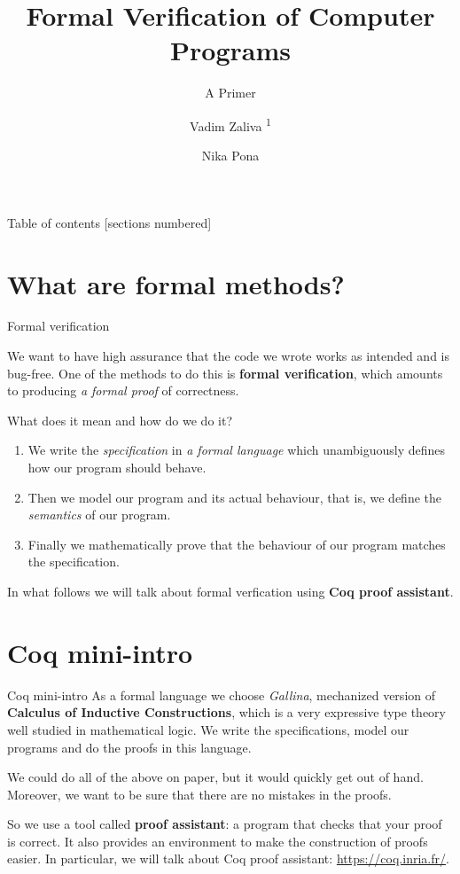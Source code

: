 \documentclass[10pt]{beamer}
\title{Formal Verification of Computer Programs}
\subtitle{A Primer}
\date{\date{}}
\author[shortname]{Vadim Zaliva \textsuperscript{1} \and Nika Pona \inst{2}}
\institute[shortinst]{\textsuperscript{1}Carnegie Mellon  University \and \inst{2} Digamma.ai}
\begin{document}
\maketitle

\begin{frame}{Table of contents}
  [sections numbered]
  \tableofcontents[hideallsubsections]
\end{frame}


\section{What are formal methods?}
\begin{frame}{Formal verification}
 
  We want to have high assurance that the code we wrote works as intended and is bug-free. One of the methods to do this is {\bf formal verification}, which amounts to producing {\it a formal proof} of correctness.

  {\center What does it mean and how do we do it?}
  
  \begin{enumerate}
  \item We write the \emph{specification} in {\it a formal language} which unambiguously defines how our program should behave.
  \item Then we model our program and its actual behaviour, that is, we define the \emph{semantics} of our program. 
  \item Finally we mathematically prove that the behaviour of our program matches the specification.
\end{enumerate}

In what follows we will talk about formal verfication using {\bf Coq proof assistant}.
  
\end{frame}

\section{Coq mini-intro}

\begin{frame}{Coq mini-intro}
  As a formal language we choose {\it Gallina}, mechanized version of {\bf Calculus of Inductive Constructions}, which is a very expressive type theory well studied in mathematical logic. We write the specifications, model our programs and do the proofs in this language.

  \smallskip
We could do all of the above on paper, but it would quickly get out of hand. Moreover, we want to be sure that there are no mistakes in the proofs.
  
  So we use a tool called {\bf proof assistant}: a program that checks that your proof is correct. It also provides an environment to make the construction of proofs easier. In particular, we will talk about Coq proof assistant: \url{https://coq.inria.fr/}.
  
  
\end{frame}
\end{document}
